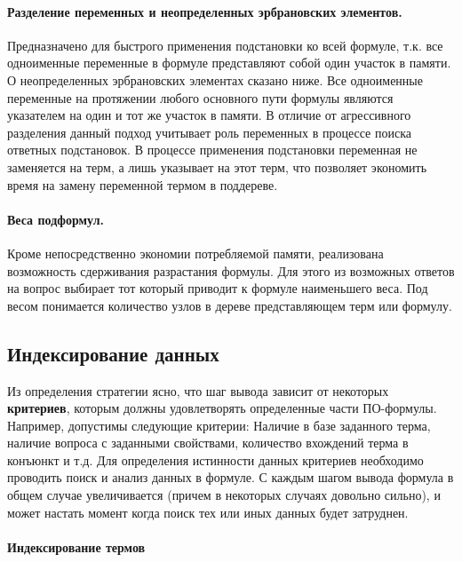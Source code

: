 \paragraph{Разделение переменных и неопределенных эрбрановских элементов.} Предназначено для быстрого применения подстановки ко всей формуле, т.к. все одноименные переменные в формуле представляют собой один участок в памяти. О неопределенных эрбрановских элементах сказано ниже. Все одноименные переменные на протяжении любого основного пути формулы \cite{dissChe} являются указателем на один и тот же участок в памяти. В отличие от агрессивного разделения данный подход учитывает роль переменных в процессе поиска ответных подстановок. В процессе применения подстановки переменная не заменяется на терм, а лишь указывает на этот терм, что позволяет экономить время на замену переменной термом в поддереве. 

\paragraph{Веса подформул.} Кроме непосредственно экономии потребляемой памяти, реализована возможность сдерживания разрастания формулы. Для этого из возможных ответов на вопрос выбирает тот который приводит к формуле наименьшего веса. Под весом понимается количество узлов в дереве представляющем терм или формулу.


\subsection{Индексирование данных}

Из определения стратегии ясно, что шаг вывода зависит от некоторых \textbf{критериев}, которым должны удовлетворять определенные части ПО-формулы. Например, допустимы следующие критерии: Наличие в базе заданного терма, наличие вопроса с заданными свойствами, количество вхождений терма в конъюнкт и т.д. Для определения истинности данных критериев необходимо проводить поиск и анализ данных в формуле. С каждым шагом вывода формула в общем случае увеличивается (причем в некоторых случаях довольно сильно), и может настать момент когда поиск тех или иных данных будет затруднен. 

\paragraph{Индексирование термов} 

